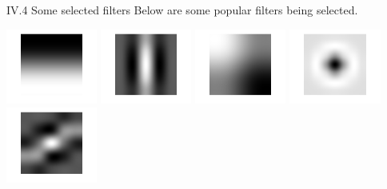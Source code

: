 \documentclass[12pt]{article}
\newenvironment{problem}[2][Part]{\begin{trivlist}
\item[\hskip \labelsep {\bfseries #1}\hskip \labelsep {\bfseries #2}]}{\end{trivlist}}
\begin{document}
\begin{problem}{IV Results}
\begin{center}
\end{center}
\item{IV.4 Some selected filters}
Below are some popular filters being selected.
\begin{center}
	\includegraphics[width=3cm]{Code/Results/selected_filter_1.png}
	\includegraphics[width=3cm]{Code/Results/selected_filter_2.png}
	\includegraphics[width=3cm]{Code/Results/selected_filter_3.png}
	\includegraphics[width=3cm]{Code/Results/selected_filter_5.png}
	\includegraphics[width=3cm]{Code/Results/selected_filter_6.png}
\end{center}
\end{problem}

 
\end{document}

